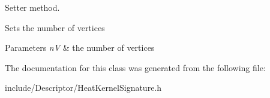 Setter method. 

Sets the number of vertices 
\begin{DoxyParams}{Parameters}
{\em n\-V} & the number of vertices \\
\hline
\end{DoxyParams}


The documentation for this class was generated from the following file\-:\begin{DoxyCompactItemize}
\item 
include/\-Descriptor/Heat\-Kernel\-Signature.\-h\end{DoxyCompactItemize}
